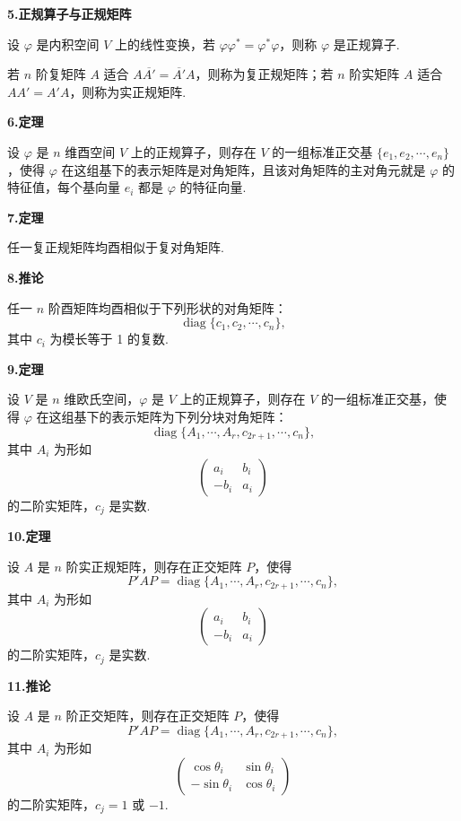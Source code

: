 \documentclass[UTF8, 12pt, fontset=fandol, oneside]{ctexart}
\begin{document}
\noindent\textbf{5.\quad 正规算子与正规矩阵}

设 $\varphi$ 是内积空间 $V$ 上的线性变换，若 $\varphi\varphi^*=\varphi^*\varphi$，则称 $\varphi$ 是正规算子.

若 $n$ 阶复矩阵 $A$ 适合 $A\overline{A'}=\overline{A'}A$，则称为复正规矩阵；若 $n$ 阶实矩阵 $A$ 适合 $AA'=A'A$，则称为实正规矩阵.

\noindent\textbf{6.\quad 定理}

设 $\varphi$ 是 $n$ 维酉空间 $V$ 上的正规算子，则存在 $V$ 的一组标准正交基 $\{e_1,e_2,\cdots,e_n\}$，使得 $\varphi$ 在这组基下的表示矩阵是对角矩阵，且该对角矩阵的主对角元就是 $\varphi$ 的特征值，每个基向量 $e_i$ 都是 $\varphi$ 的特征向量.

\noindent\textbf{7.\quad 定理}

任一复正规矩阵均酉相似于复对角矩阵.

\noindent\textbf{8.\quad 推论}

任一 $n$ 阶酉矩阵均酉相似于下列形状的对角矩阵：
\[
\operatorname{diag}\{c_1,c_2,\cdots,c_n\},
\]
其中 $c_i$ 为模长等于 1 的复数.

\noindent\textbf{9.\quad 定理}

设 $V$ 是 $n$ 维欧氏空间，$\varphi$ 是 $V$ 上的正规算子，则存在 $V$ 的一组标准正交基，使得 $\varphi$ 在这组基下的表示矩阵为下列分块对角矩阵：
\begin{equation}
\operatorname{diag}\{A_1,\cdots,A_r,c_{2r+1},\cdots,c_n\},
\tag{9.1}
\end{equation}
其中 $A_i$ 为形如
\[
\begin{pmatrix}
a_i & b_i\\
-b_i & a_i
\end{pmatrix}
\]
的二阶实矩阵，$c_j$ 是实数.

\noindent\textbf{10.\quad 定理}

设 $A$ 是 $n$ 阶实正规矩阵，则存在正交矩阵 $P$，使得
\[
P'AP=\operatorname{diag}\{A_1,\cdots,A_r,c_{2r+1},\cdots,c_n\},
\]
其中 $A_i$ 为形如
\[
\begin{pmatrix}
a_i & b_i\\
-b_i & a_i
\end{pmatrix}
\]
的二阶实矩阵，$c_j$ 是实数.

\noindent\textbf{11.\quad 推论}

设 $A$ 是 $n$ 阶正交矩阵，则存在正交矩阵 $P$，使得
\[
P'AP=\operatorname{diag}\{A_1,\cdots,A_r,c_{2r+1},\cdots,c_n\},
\]
其中 $A_i$ 为形如
\[
\begin{pmatrix}
\cos\theta_i & \sin\theta_i\\
-\sin\theta_i & \cos\theta_i
\end{pmatrix}
\]
的二阶实矩阵，$c_j=1$ 或 $-1$.
\end{document}
